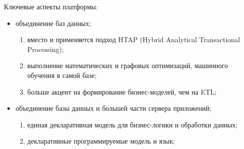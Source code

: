 Ключевые аспекты платформы:
\begin{itemize}
  \item объединение баз данных;
    \begin{enumerate}[leftmargin=5.5mm]
      \item вместо \olap и \oltp применяется подход HTAP (Hybrid Analytical Transactional Processing);
      \item выполнение математических и графовых оптимизаций, машинного обучения в самой базе;
      \item больше акцент на формирование бизнес-моделей, чем на ETL;
    \end{enumerate}
  \item объединение базы данных и большей части сервера приложений;
  \begin{enumerate}[leftmargin=5.5mm]
    \item единая декларативная модель для бизнес-логики и обработки данных;
    \item декларативные программируемые модель и язык;
  \end{enumerate}
\end{itemize}



